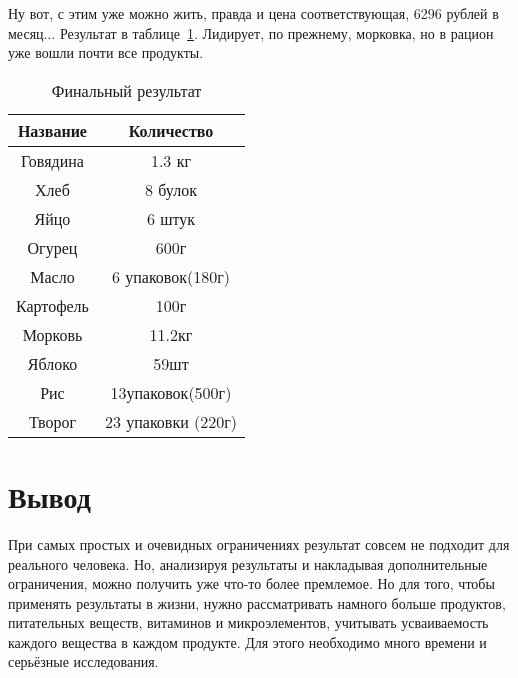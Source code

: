 \documentclass[]{article}
\begin{document}
Ну вот, с этим уже можно жить, правда и цена соответствующая, 6296 рублей в месяц... Результат в таблице~\ref{tab:4}. Лидирует, по прежнему,
морковка, но в рацион уже вошли почти все продукты.
\begin{table}
	\caption{Финальный результат}
	\centering
	\label{tab:4}
	\begin{tabular}{|c|c|}
		\hline
		Название&Количество\\
		\hline
		Говядина & 1.3 кг\\
		\hline
		Хлеб & 8 булок\\
		\hline
		Яйцо & 6 штук\\
		\hline
		Огурец & 600г\\
		\hline
		Масло & 6 упаковок(180г)\\
		\hline
		Картофель & 100г\\
		\hline
		Морковь & 11.2кг\\
		\hline
		Яблоко & 59шт\\
		\hline
		Рис & 13упаковок(500г) \\
		\hline
		Творог & 23 упаковки (220г)\\
		\hline

	\end{tabular}

\end{table}
\section{Вывод}
При самых простых и очевидных ограничениях результат совсем не подходит для
реального человека. Но, анализируя результаты и накладывая дополнительные
ограничения, можно получить уже что-то более премлемое. Но для того, чтобы
применять результаты в жизни, нужно рассматривать намного больше продуктов,
питательных веществ, витаминов и микроэлементов, учитывать усваиваемость
каждого вещества в каждом продукте. Для этого необходимо много времени и
серьёзные исследования.
\end{document}
